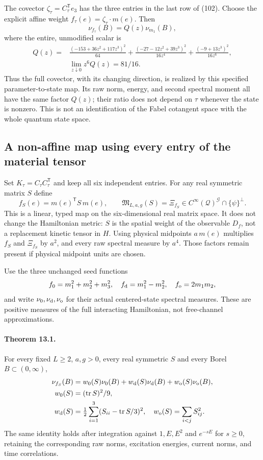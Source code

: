 \documentclass[11pt]{article}
\newcommand{\tr}{\operatorname{tr}}
\begin{document}
The covector $\zeta_\tau=C_\tau^{\mathsf T}e_3$ has the three entries
in the last row of (102). Choose the explicit affine
weight $f_\tau(e)=\zeta_\tau\cdot m(e)$. Then
\[
 \nu_{f_\tau}(B)=Q(z)\nu_{m_1}(B),
\]
where the entire, unmodified scalar is
\begin{align*}
 Q(z)={}&\frac{(-153+36z^2+117z^3)^2}{64}
 +\frac{(-27-12z^2+39z^3)^2}{16z^4}
 +\frac{(-9+13z^3)^2}{16z^6},\\
 &\lim_{z\downarrow0}z^6Q(z)=81/16 .
\end{align*}
Thus the full covector, with its changing direction, is realized by this
specified parameter-to-state map. Its raw norm, energy, and second spectral
moment all have the same factor $Q(z)$; their ratio does not depend on
$\tau$ whenever the state is nonzero. This is not an identification of
the Fabel cotangent space with the whole quantum state space.

\subsection{A non-affine map using every entry of the material tensor}
Set $K_\tau=C_\tau C_\tau^{\mathsf T}$ and keep all six independent entries.
For any real symmetric matrix $S$ define
\begin{equation}\label{eq:fabel-quadratic-map}
 f_S(e)=m(e)^{\mathsf T}S\,m(e),\qquad
 \mathfrak M_{L,a,g}(S)=\Xi_{f_S}\in
 C^\infty(\mathcal Q)^{\mathcal G}\cap\{\psi\}^{\perp}.
\end{equation}
This is a linear, typed map on the six-dimensional real matrix space.
It does not change the Hamiltonian metric: $S$ is the spatial weight of
the observable $D_f$, not a replacement kinetic tensor in $H$.
Using physical midpoints $a\,m(e)$ multiplies $f_S$ and $\Xi_{f_S}$ by
$a^2$, and every raw spectral measure by $a^4$.
Those factors remain present if physical midpoint units are chosen.

Use the three unchanged seed functions
\[
 f_0=m_1^2+m_2^2+m_3^2,\quad
 f_{\rm d}=m_1^2-m_2^2,\quad f_{\rm o}=2m_1m_2,
\]
and write $\nu_0,\nu_{\rm d},\nu_{\rm o}$ for their actual centered-state
spectral measures. These are positive measures of the full interacting
Hamiltonian, not free-channel approximations.

\paragraph{Theorem 13.1.}
For every fixed $L\ge2$, $a,g>0$, every real symmetric $S$ and every Borel
$B\subset(0,\infty)$,
\begin{align}
 \nu_{f_S}(B)&=w_0(S)\nu_0(B)+w_{\rm d}(S)\nu_{\rm d}(B)
                         +w_{\rm o}(S)\nu_{\rm o}(B),\label{eq:fabel-sector-measure}\\
 w_0(S)&=(\tr S)^2/9,\nonumber\\
 w_{\rm d}(S)&=\tfrac12\sum_{i=1}^3(S_{ii}-\tr S/3)^2,\quad
 w_{\rm o}(S)=\sum_{i<j}S_{ij}^2.\nonumber
\end{align}
The same identity holds after integration against $1,E,E^2$ and
$e^{-sE}$ for $s\ge0$, retaining the corresponding raw norms,
excitation energies, current norms, and time correlations.
\end{document}
